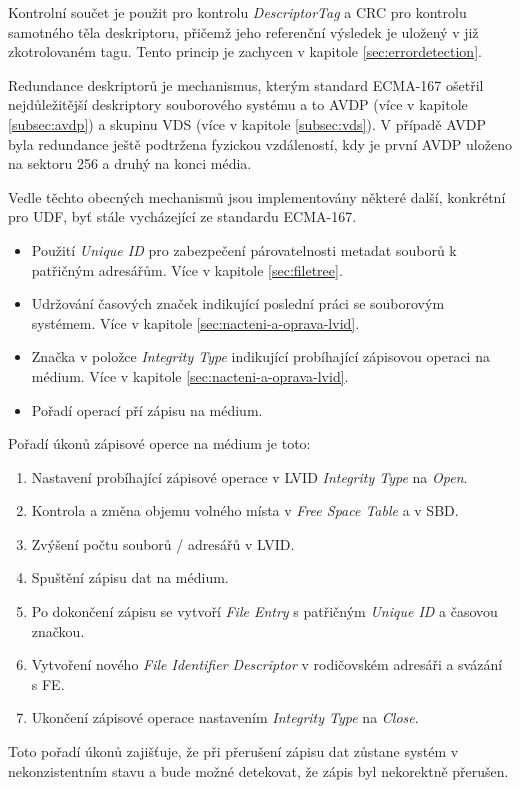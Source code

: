 Kontrolní součet je použit pro kontrolu \textit{DescriptorTag} a CRC pro kontrolu samotného těla deskriptoru, přičemž jeho referenční výsledek je uložený v již zkotrolovaném tagu. Tento princip je zachycen v kapitole \ref{sec:errordetection}.

Redundance deskriptorů je mechanismus, kterým standard ECMA-167 ošetřil nejdůležitější deskriptory souborového systému a to AVDP (více v kapitole \ref{subsec:avdp}) a skupinu VDS (více v kapitole \ref{subsec:vds}). V případě AVDP byla redundance ještě podtržena fyzickou vzdáleností, kdy je první AVDP uloženo na sektoru 256 a druhý na konci média.

Vedle těchto obecných mechanismů jsou implementovány některé další, konkrétní pro UDF, byť stále vycházející ze standardu ECMA-167.
\begin{itemize}
    \item Použití \textit{Unique ID} pro zabezpečení párovatelnosti metadat souborů k patřičným adresářům. Více v kapitole \ref{sec:filetree}. 
    \item Udržování časových značek indikující poslední práci se souborovým systémem. Více v kapitole \ref{sec:nacteni-a-oprava-lvid}.
    \item Značka v položce \textit{Integrity Type} indikující probíhající zápisovou operaci na médium. Více v kapitole \ref{sec:nacteni-a-oprava-lvid}.
    \item Pořadí operací pří zápisu na médium.
\end{itemize}
Pořadí úkonů zápisové operce na médium je toto:
\begin{enumerate}
    \item Nastavení probíhající zápisové operace v LVID \textit{Integrity Type} na \textit{Open}.
    \item Kontrola a změna objemu volného místa v \textit{Free Space Table} a v SBD.
    \item Zvýšení počtu souborů / adresářů v LVID.
    \item Spuštění zápisu dat na médium.
    \item Po dokončení zápisu se vytvoří \textit{File Entry} s patřičným \textit{Unique ID} a časovou značkou. 
    \item Vytvoření nového \textit{File Identifier Descriptor} v rodičovském adresáři a svázání s FE.
    \item Ukončení zápisové operace nastavením \textit{Integrity Type} na \textit{Close}.
\end{enumerate}
Toto pořadí úkonů zajišťuje, že při přerušení zápisu dat zůstane systém v nekonzistentním stavu a bude možné detekovat, že zápis byl nekorektně přerušen.

